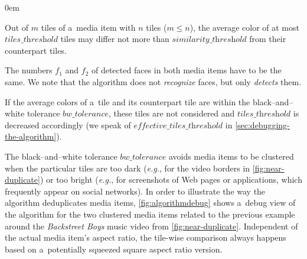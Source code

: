 \documentclass{article}
\begin{document}
\begin{description}
  \itemsep0em 
  \item[Cond.~1] Out of $m$ tiles of a~media item with $n$ tiles ($m \leq n$),
    the average color of at most $\textit{tiles\_threshold}$ tiles may differ
    not more than $\textit{similarity\_threshold}$ from their counterpart tiles.
  \item[Cond.~2] The numbers $f_1$ and $f_2$ of detected faces in both media items
    have to be the same.
    We note that the algorithm does not \emph{recognize} faces,
    but only \emph{detects} them.
  \item[Cond.~3] If the average colors of a~tile and its counterpart tile
    are within the black--and--white tolerance $\textit{bw\_tolerance}$,
    these tiles are not considered and $\textit{tiles\_threshold}$
    is decreased accordingly (we speak of $\textit{effective\_tiles\_threshold}$
    in \autoref{sec:debugging-the-algorithm}).
\end{description}

The black--and--white tolerance $\textit{bw\_tolerance}$
avoids media items to be clustered when the particular tiles are too dark
(\emph{e.g.}, for the video borders in \autoref{fig:near-duplicate})
or too bright (\emph{e.g.}, for screenshots of Web pages or applications,
which frequently appear on social networks).
In order to illustrate the way the algorithm deduplicates media items,
\autoref{fig:algorithmdebug} shows a~debug view of the algorithm
for the two clustered media items related to the previous example around the
\emph{Backstreet Boys} music video from \autoref{fig:near-duplicate}.
Independent of the actual media item's aspect ratio,
the tile-wise comparison always happens based on a~potentially squeezed
square aspect ratio version.
\end{document}
